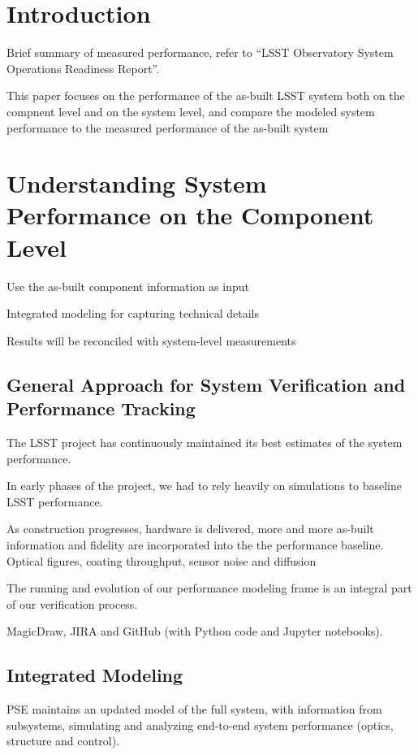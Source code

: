 \section{Introduction}

Brief summary of measured performance, refer to ``LSST Observatory System Operations Readiness Report''.

This paper focuses on the performance of the as-built LSST system both on the compnent level and on the system level,
and compare the modeled system performance to the measured performance of the as-built system

\section{Understanding System Performance on the Component Level}

Use the as-built component information as input

Integrated modeling for capturing technical details

Results will be reconciled with system-level measurements

\subsection{General Approach for System Verification and Performance Tracking}

The LSST project has continuously maintained its best estimates of the system performance.

In early phases of the project, we had to rely heavily on simulations to baseline LSST performance.

As construction progresses, hardware is delivered, more and more as-built information and fidelity are
incorporated into the the performance baseline.
Optical figures, coating throughput, sensor noise and diffusion

The running and evolution of our performance modeling frame is an integral part of our verification process.

MagicDraw, JIRA and GitHub (with Python code and Jupyter notebooks).

\subsection{Integrated Modeling}

PSE maintains an updated model of the full system, with information from subsystems, simulating and analyzing end-to-end system performance (optics, structure and control).

